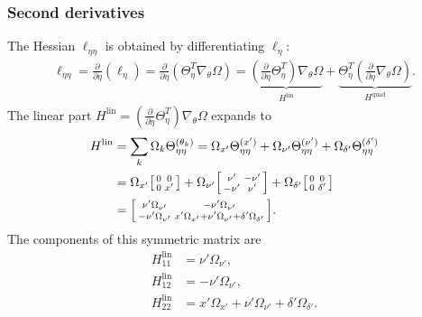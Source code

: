 \documentclass{article}
\begin{document}
\subsubsection{Second derivatives}

The Hessian $\ell_{\eta\eta}$ is obtained by differentiating $\ell_\eta$:
%
\begin{align}
  \ell_{\eta\eta} = \frac{\partial}{\partial \eta} (\ell_\eta) = \frac{\partial}{\partial \eta} (\Theta_\eta^T \nabla_\theta \Omega) = \underbrace{(\frac{\partial}{\partial \eta} \Theta_\eta^T) \nabla_\theta \Omega}_{H^{\text{lin}}} + \underbrace{\Theta_\eta^T (\frac{\partial}{\partial \eta} \nabla_\theta \Omega)}_{H^{\text{quad}}}.
\end{align}
%
The linear part $H^{\text{lin}} = (\frac{\partial}{\partial \eta} \Theta_\eta^T) \nabla_\theta \Omega$ expands to
%
\begin{align}
  H^{\text{lin}} & = \sum_k \Omega_k \Theta_{\eta\eta}^{(\theta_k)} = \Omega_{x'} \Theta_{\eta\eta}^{(x')} + \Omega_{\nu'} \Theta_{\eta\eta}^{(\nu')} + \Omega_{\delta'} \Theta_{\eta\eta}^{(\delta')} \\
                 & = \Omega_{x'} \begin{bsmallmatrix} 0 & 0 \\ 0 & x' \end{bsmallmatrix} + \Omega_{\nu'} \begin{bsmallmatrix} \nu' & -\nu' \\ -\nu' & \nu' \end{bsmallmatrix} + \Omega_{\delta'} \begin{bsmallmatrix} 0 & 0 \\ 0 & \delta' \end{bsmallmatrix}                                    \\
                 & = \begin{bsmallmatrix} \nu' \Omega_{\nu'} & -\nu' \Omega_{\nu'} \\ -\nu' \Omega_{\nu'} & x' \Omega_{x'} + \nu' \Omega_{\nu'} + \delta' \Omega_{\delta'} \end{bsmallmatrix}.
\end{align}
%
The components of this symmetric matrix are
%
\begin{align}
  H^{\text{lin}}_{11} & = \nu' \Omega_{\nu'},                                             \\
  H^{\text{lin}}_{12} & = -\nu' \Omega_{\nu'},                                            \\
  H^{\text{lin}}_{22} & = x' \Omega_{x'} + \nu' \Omega_{\nu'} + \delta' \Omega_{\delta'}.
\end{align}
\end{document}
